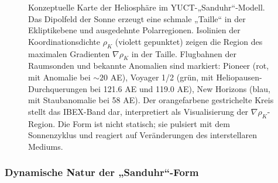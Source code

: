 \documentclass[12pt,a4paper]{article}
\theoremstyle{remark}
\begin{document}
\begin{figure}[htbp]
		\caption{Konzeptuelle Karte der Heliosphäre im YUCT-„Sanduhr“-Modell. Das Dipolfeld der Sonne erzeugt eine schmale „Taille“ in der Ekliptikebene und ausgedehnte Polarregionen. Isolinien der Koordinationsdichte $\rho_K$ (violett gepunktet) zeigen die Region des maximalen Gradienten $\nabla\rho_K$ in der Taille. Flugbahnen der Raumsonden und bekannte Anomalien sind markiert: Pioneer (rot, mit Anomalie bei $\sim20$ AE), Voyager 1/2 (grün, mit Heliopausen-Durchquerungen bei 121.6 AE und 119.0 AE), New Horizons (blau, mit Staubanomalie bei 58 AE). Der orangefarbene gestrichelte Kreis stellt das IBEX-Band dar, interpretiert als Visualisierung der $\nabla\rho_K$-Region. Die Form ist nicht statisch; sie pulsiert mit dem Sonnenzyklus und reagiert auf Veränderungen des interstellaren Mediums.}
		\label{fig:coord:heliosphere_hourglass}
	\end{figure}
	
	\subsubsection{Dynamische Natur der „Sanduhr“-Form}
	\label{subsubsec:coord:dynamic}
	
\end{document}
